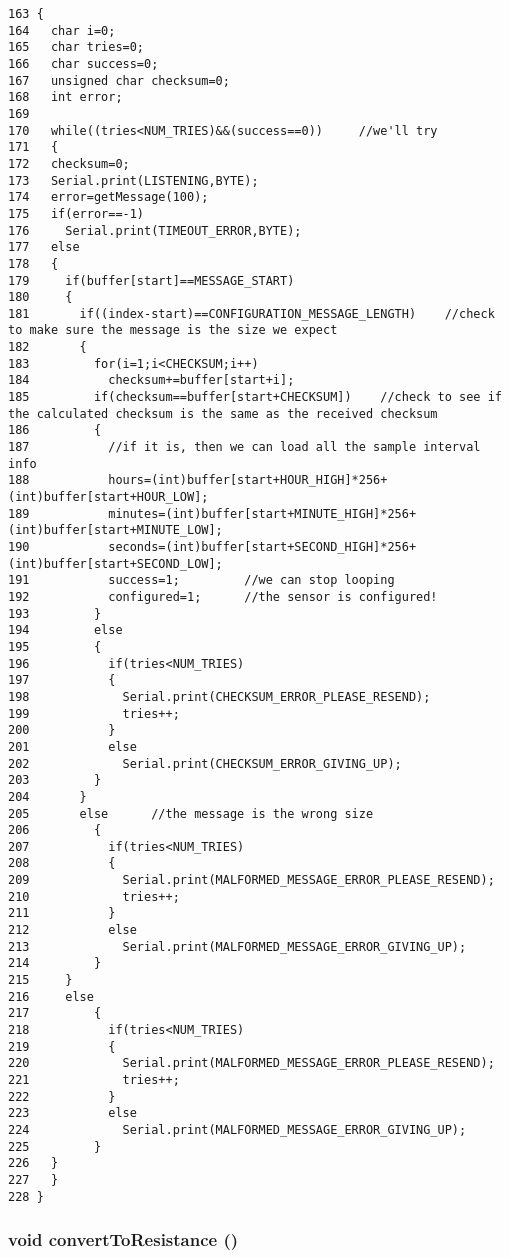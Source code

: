 \begin{Code}\begin{verbatim}163 { 
164   char i=0;
165   char tries=0;
166   char success=0;
167   unsigned char checksum=0;
168   int error;
169   
170   while((tries<NUM_TRIES)&&(success==0))     //we'll try
171   {
172   checksum=0;
173   Serial.print(LISTENING,BYTE);
174   error=getMessage(100);
175   if(error==-1)
176     Serial.print(TIMEOUT_ERROR,BYTE);
177   else
178   {
179     if(buffer[start]==MESSAGE_START)
180     {
181       if((index-start)==CONFIGURATION_MESSAGE_LENGTH)    //check to make sure the message is the size we expect
182       {
183         for(i=1;i<CHECKSUM;i++)
184           checksum+=buffer[start+i];
185         if(checksum==buffer[start+CHECKSUM])    //check to see if the calculated checksum is the same as the received checksum
186         {
187           //if it is, then we can load all the sample interval info
188           hours=(int)buffer[start+HOUR_HIGH]*256+(int)buffer[start+HOUR_LOW];
189           minutes=(int)buffer[start+MINUTE_HIGH]*256+(int)buffer[start+MINUTE_LOW];
190           seconds=(int)buffer[start+SECOND_HIGH]*256+(int)buffer[start+SECOND_LOW];
191           success=1;         //we can stop looping
192           configured=1;      //the sensor is configured!
193         }
194         else
195         {
196           if(tries<NUM_TRIES)
197           {
198             Serial.print(CHECKSUM_ERROR_PLEASE_RESEND);
199             tries++;
200           }
201           else
202             Serial.print(CHECKSUM_ERROR_GIVING_UP);
203         }
204       }
205       else      //the message is the wrong size
206         {
207           if(tries<NUM_TRIES)
208           {
209             Serial.print(MALFORMED_MESSAGE_ERROR_PLEASE_RESEND);
210             tries++;
211           }
212           else
213             Serial.print(MALFORMED_MESSAGE_ERROR_GIVING_UP);
214         }
215     }
216     else
217         {
218           if(tries<NUM_TRIES)
219           {
220             Serial.print(MALFORMED_MESSAGE_ERROR_PLEASE_RESEND);
221             tries++;
222           }
223           else
224             Serial.print(MALFORMED_MESSAGE_ERROR_GIVING_UP);
225         }
226   }
227   }
228 }
\end{verbatim}
\end{Code}


\hypertarget{temperature__sensor___terciopelo_8pde_8e666a34a083b1806167ca991be0c436}{
\subsubsection[{convertToResistance}]{\setlength{\rightskip}{0pt plus 5cm}void convertToResistance ()}}
\label{temperature__sensor___terciopelo_8pde_8e666a34a083b1806167ca991be0c436}


